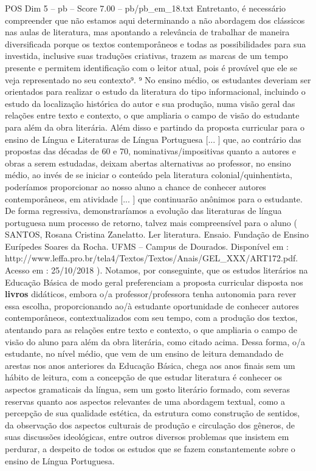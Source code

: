 \begin{textsample}{POS Dim 5 – pb – Score 7.00 – pb/pb\_em\_18.txt}
Entretanto, é necessário compreender que não estamos aqui determinando a não abordagem dos clássicos nas aulas de literatura, mas apontando a relevância de trabalhar de maneira diversificada porque os textos contemporâneos e todas as possibilidades para sua investida, inclusive suas traduções criativas, trazem as marcas de um tempo presente e permitem identificação com o leitor atual, pois é provável que ele se veja representado no seu contexto⁹. ⁹ No ensino médio, os estudantes deveriam ser orientados para realizar o estudo da literatura do tipo informacional, incluindo o estudo da localização histórica do autor e sua produção, numa visão geral das relações entre texto e contexto, o que ampliaria o campo de visão do estudante para além da obra literária.
Além disso e partindo da proposta curricular para o ensino de Língua e Literaturas de Língua Portuguesa [... ] que, ao contrário das propostas das décadas de 60 e 70, nominativas/impositivas quanto a autores e obras a serem estudadas, deixam abertas alternativas ao professor, no ensino médio, ao invés de se iniciar o conteúdo pela literatura colonial/quinhentista, poderíamos proporcionar ao nosso aluno a chance de conhecer autores contemporâneos, em atividade [... ] que continuarão anônimos para o estudante.
De forma regressiva, demonstraríamos a evolução das literaturas de língua portuguesa num processo de retorno, talvez mais compreensível para o aluno ( SANTOS, Rosana Cristina Zanelatto.
Ler literatura.
Ensaio.
Fundação de Ensino Eurípedes Soares da Rocha.
UFMS – Campus de Dourados.
Disponível em : http://www.leffa.pro.br/tela4/Textos/Textos/Anais/GEL\_XXX/ART172.pdf.
Acesso em : 25/10/2018 ).
Notamos, por conseguinte, que os estudos literários na Educação Básica de modo geral preferenciam a proposta curricular disposta nos \textbf{livros} didáticos, embora o/a professor/professora tenha autonomia para rever essa escolha, proporcionando ao/à estudante oportunidade de conhecer autores contemporâneos, contextualizados com seu tempo, com a produção dos textos, atentando para as relações entre texto e contexto, o que ampliaria o campo de visão do aluno para além da obra literária, como citado acima.
Dessa forma, o/a estudante, no nível médio, que vem de um ensino de leitura demandado de arestas nos anos anteriores da Educação Básica, chega aos anos finais sem um hábito de leitura, com a concepção de que estudar literatura é conhecer os aspectos gramaticais da língua, sem um gosto literário formado, com severas reservas quanto aos aspectos relevantes de uma abordagem textual, como a percepção de sua qualidade estética, da estrutura como construção de sentidos, da observação dos aspectos culturais de produção e circulação dos gêneros, de suas discussões ideológicas, entre outros diversos problemas que insistem em perdurar, a despeito de todos os estudos que se fazem constantemente sobre o ensino de Língua Portuguesa.

\end{textsample}
